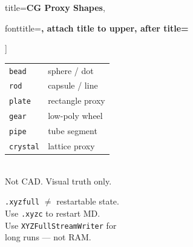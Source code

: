 \documentclass[12pt, a4paper, oneside]{article}
\begin{document}
\begin{tcolorbox}
\begin{multicols}{2}
\begin{tcolorbox}
  title={\bfseries\small CG Proxy Shapes},

  fonttitle=\small\bfseries, attach title to upper, after title={\\[2pt]}

]

\small

\begin{tabular}{ll}

\texttt{bead}    & sphere / dot \\

\texttt{rod}     & capsule / line \\

\texttt{plate}   & rectangle proxy \\

\texttt{gear}    & low-poly wheel \\

\texttt{pipe}    & tube segment \\

\texttt{crystal} & lattice proxy \\

\end{tabular}\\[4pt]

Not CAD.  Visual truth only.

\end{tcolorbox}


\medskip


\begin{tcolorbox}[

  colback=warnredlight, colframe=warnred,

  boxrule=0.7pt, arc=3pt, left=4pt, right=4pt, top=3pt, bottom=3pt,

  title={\bfseries\small NOT a checkpoint},

  fonttitle=\small\bfseries, attach title to upper, after title={\\[2pt]}

]

\small

\texttt{.xyzfull} $\neq$ restartable state.\\

Use \texttt{.xyzc} to restart MD.\\

Use \texttt{XYZFullStreamWriter} for\\

long runs --- not RAM.

\end{tcolorbox}


\end{multicols}


\end{tcolorbox}
\end{document}
